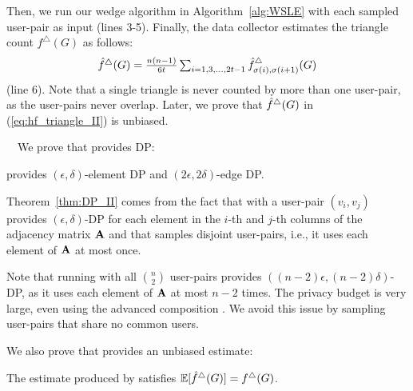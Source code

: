 Then, we run our wedge algorithm \AlgWSLE{} in Algorithm~\ref{alg:WSLE} with each sampled user-pair as input (lines 3-5).
Finally, the data collector estimates the triangle count $f^\triangle(G)$ as follows:
\begin{align}
    \textstyle{\hat{f}^\triangle(G) = \frac{n(n-1)}{6t} \sum_{i=1, 3, \ldots, 2t-1} \hat{f}_{\sigma(i),\sigma(i+1)}^\triangle(G)}
   \label{eq:hf_triangle_II}
\end{align}
(line 6). 
Note that a single triangle is never counted by more than one user-pair, as the user-pairs never overlap. 
Later, we prove that $\hat{f}^\triangle(G)$ in (\ref{eq:hf_triangle_II}) is unbiased.

\smallskip
{}~~We prove that
\AlgWSTri{} provides DP:
\begin{theorem}
\label{thm:DP_II}
\AlgWSTri{} provides $(\epsilon, \delta)$-element DP and $(2\epsilon, 2\delta)$-edge DP.
\end{theorem}
Theorem~\ref{thm:DP_II} comes from the fact that
\AlgWSLE{} with a user-pair $(v_i,v_j)$ provides $(\epsilon,\delta)$-DP for each element in the $i$-th and $j$-th columns of the adjacency matrix $\mathbf{A}$ and that \AlgWSTri{} samples disjoint user-pairs, i.e., it uses each element of $\mathbf{A}$ at most once.

Note that running \AlgWSLE{} with all $\binom{n}{2}$ user-pairs 
provides $((n-2) \epsilon, (n-2) \delta)$-DP, as it uses each element of $\mathbf{A}$ at most $n-2$ times.
The privacy budget is very large, even using the advanced composition \cite{DP,Kairouz_ICML15}.
We avoid this issue by sampling user-pairs that share no common users.

We also prove that
\AlgWSTri{} provides an unbiased estimate:
\begin{theorem}
\label{thm:unbiased_II}
The estimate produced by \AlgWSTri{} satisfies $\allowbreak \mathbb{E}[\hat{f}^\triangle(G)] = f^\triangle(G)$.
\end{theorem}

